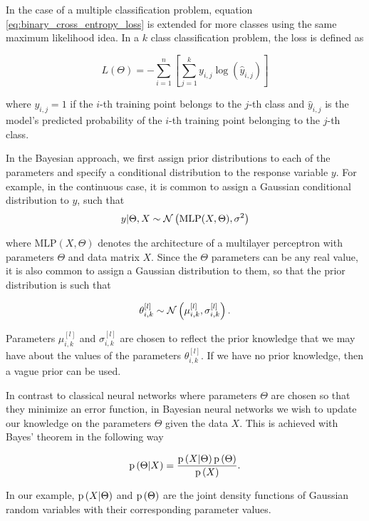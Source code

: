 In the case of a multiple classification problem, equation \ref{eq:binary_cross_entropy_loss} is extended for more classes using the same maximum likelihood idea. In a $k$ class classification problem, the loss is defined as

\begin{equation*}
  L(\Theta) = - \sum_{i = 1}^n \left[ \sum_{j = 1}^k y_{i,j} \log{\left( \hat{y}_{i,j} \right)}  \right]
\end{equation*}

where $y_{i,j} = 1$ if the $i$-th training point belongs to the $j$-th class and $\hat{y}_{i,j}$ is the model's predicted probability of the $i$-th training point belonging to the $j$-th class.

In the Bayesian approach, we first assign prior distributions to each of the parameters and specify a conditional distribution to the response variable $y$. For example, in the continuous case, it is common to assign a Gaussian conditional distribution to $y$, such that
$$
  y | \Theta, X \sim \mathcal{N}\left( \mathrm{MLP}(X, \Theta), \sigma^2 \right)
$$

where $\mathrm{MLP}(X, \Theta)$ denotes the architecture of a multilayer perceptron with parameters $\Theta$ and data matrix $X$. Since the $\Theta$ parameters can be any real value, it is also common to assign a Gaussian distribution to them, so that the prior distribution is such that

$$
  \theta_{i,k}^{[l]} \sim \mathcal{N}\left( \mu_{i,k}^{[l]}, \sigma_{i,k}^{[l]} \right).
$$

Parameters $\mu_{i,k}^{[l]}$ and $\sigma_{i,k}^{[l]}$ are chosen to reflect the prior knowledge that we may have about the values of the parameters $\theta_{i,k}^{[l]}$. If we have no prior knowledge, then a vague prior can be used.

In contrast to classical neural networks where parameters $\Theta$ are chosen so that they minimize an error function, in Bayesian neural networks we wish to update our knowledge on the parameters $\Theta$ given the data $X$. This is achieved with Bayes' theorem in the following way

$$
  \mathrm{p}\left( \Theta | X \right) = \frac{\mathrm{p}\left( X | \Theta \right) \mathrm{p}\left( \Theta \right)}{\mathrm{p}\left( X \right)}.
$$

In our example, $\mathrm{p}\left( X | \Theta \right)$ and $\mathrm{p}\left( \Theta \right)$ are the joint density functions of Gaussian random variables with their corresponding parameter values.


